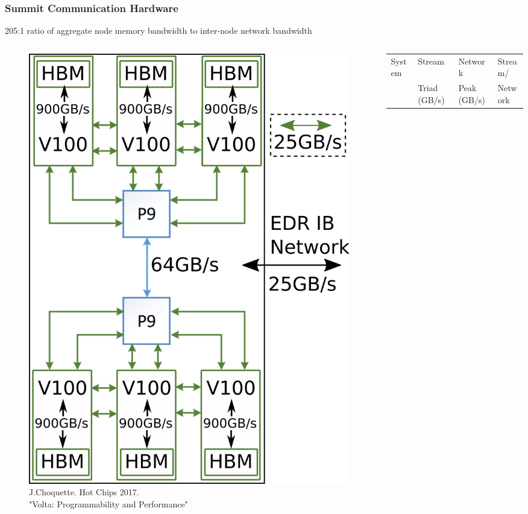 \documentclass[aspectratio=169]{beamer}
\begin{document}
\begin{frame}
  \frametitle{Summit Communication Hardware}
  205:1 ratio of aggregate node memory bandwidth to inter-node network bandwidth
    \begin{columns}
      \begin{column}{0.3\textwidth}
        \begin{figure}
          \centering
          \includegraphics[width=.9\textwidth]{figures/summit-node.png}\\
          \tiny{J.Choquette. Hot Chips 2017. \\"Volta: Programmability and Performance"}
        \end{figure}
      \end{column}
    \begin{column}{0.7\textwidth}
      { \small
      \begin{table}[]
        \begin{tabular}{llll}
          System              & Stream       & Network     & Stream/ \\
                              & Triad (GB/s) & Peak (GB/s) & Network \\

\end{tabular}
\end{table}}
\end{column}
\end{columns}
\end{frame}
\end{document}
